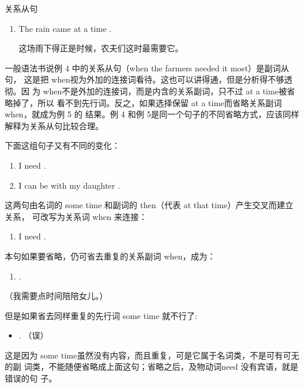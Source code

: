 关系从句
\begin{enumerate}[resume]
\item The rain came at a time .

  这场雨下得正是时候，农夫们这时最需要它。
\end{enumerate}

一般语法书说例 4 中的关系从句（when the farmers needed it most）是副词从句，
这是把 when视为外加的连接词看待。这也可以讲得通，但是分析得不够透彻。因
为 when不是外加的连接词，而是内含的关系副词，只不过 at a time被省略掉了，所以
看不到先行词。反之，如果选择保留 at a time而省略关系副词 when，就成为例 5 的
结果。例 4 和例 5是同一个句子的不同省略方式，应该同样解释为关系从句比较合理。

下面这组句子又有不同的变化：
\begin{enumerate}
\item I need .
\item I can be with my daughter .
\end{enumerate}
这两句由名词的 some time 和副词的 then（代表 at that time）产生交叉而建立关系，
可改写为关系词 when 来连接：
\begin{enumerate}[resume]
\item I need  .
\end{enumerate}
本句如果要省略，仍可省去重复的关系副词 when，成为：
\begin{enumerate}[resume]
\item {}   .
\end{enumerate}
（我需要点时间陪陪女儿。）

但是如果省去同样重复的先行词 some time 就不行了:
\begin{itemize}
\item {}  . （误）
\end{itemize}
这是因为 some time虽然没有内容，而且重复，可是它属于名词类，不是可有可无的副
词类，不能随便省略成上面这句；省略之后，及物动词need 没有宾语，就是错误的句
子。

